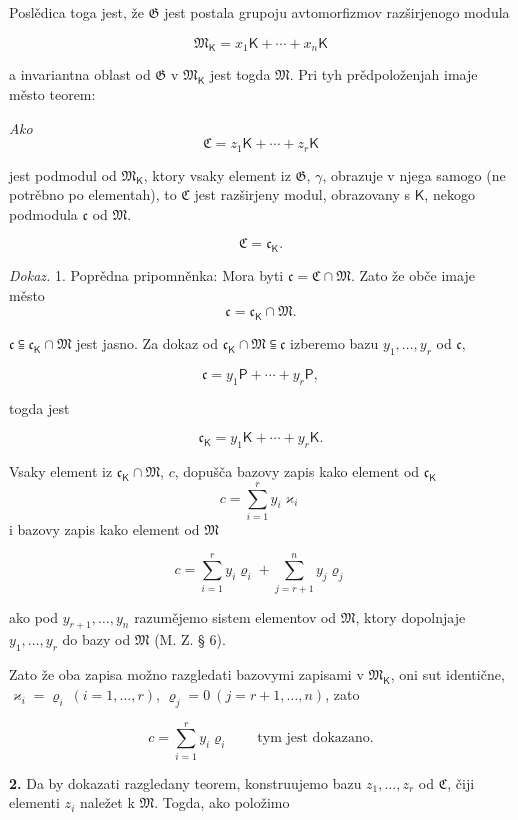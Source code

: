 \documentclass[11pt]{article}
\begin{document}
Poslědica toga jest, že \(\mathfrak G\) jest postala grupoju avtomorfizmov razširjenogo modula

\[
\mathfrak M_{\mathsf K}=x_1\mathsf K+\cdots+x_n\mathsf K
\]

a invariantna oblast od \(\mathfrak G\) v \(\mathfrak M_{\mathsf K}\) jest togda \(\mathfrak M\). Pri tyh prědpoloženjah imaje město teorem:

\begingroup\itshape
Ako
\[
\mathfrak C=z_1\mathsf K+\cdots+z_r\mathsf K
\]

jest podmodul od \(\mathfrak M_{\mathsf K}\), ktory vsaky element iz \(\mathfrak G\), \(\gamma\), obrazuje v njega samogo (ne potrěbno po elementah), to \(\mathfrak C\) jest razširjeny modul, obrazovany s \(\mathsf K\), nekogo podmodula \(\mathfrak c\) od \(\mathfrak M\).

\[
\mathfrak C=\mathfrak c_{\mathsf K}.
\]
\endgroup

\emph{Dokaz.} 1. Poprědna pripomněnka: Mora byti \(\mathfrak c=\mathfrak C\cap\mathfrak M\). Zato že obče imaje město
\[
\mathfrak c=\mathfrak c_{\mathsf K}\cap\mathfrak M.
\]

\(\mathfrak c\subseteqq\mathfrak c_{\mathsf K}\cap\mathfrak M\) jest jasno. Za dokaz od \(\mathfrak c_{\mathsf K}\cap\mathfrak M\subseteqq\mathfrak c\) izberemo bazu \(y_1,\ldots,y_r\) od \(\mathfrak c\),

\[
\mathfrak c=y_1\mathsf P+\cdots+y_r\mathsf P,
\]

togda jest

\[
\mathfrak c_{\mathsf K}=y_1\mathsf K+\cdots+y_r\mathsf K.
\]

Vsaky element iz \(\mathfrak c_{\mathsf K}\cap\mathfrak M\), \(c\), dopušča bazovy zapis kako element od \(\mathfrak c_{\mathsf K}\)
\[
c=\sum_{i=1}^{r}y_i\varkappa_i
\]
i bazovy zapis kako element od \(\mathfrak M\)

\[
c=\sum_{i=1}^{r}y_i\varrho_i+\sum_{j=r+1}^{n}y_j\varrho_j
\]

ako pod \(y_{r+1},\ldots,y_n\) razumějemo sistem elementov od \(\mathfrak M\), ktory dopolnjaje \(y_1,\ldots,y_r\) do bazy od \(\mathfrak M\) (M. Z. § 6).

Zato že oba zapisa možno razgledati bazovymi zapisami v \(\mathfrak M_{\mathsf K}\), oni sut identične, \(\varkappa_i=\varrho_i\ (i=1,\ldots,r)\), \(\varrho_j=0\ (j=r+1,\ldots,n)\), zato

\[
c=\sum_{i=1}^{r}y_i\varrho_i
\qquad\text{tym jest dokazano.}
\]

\textbf{2.} Da by dokazati razgledany teorem, konstruujemo bazu \(z_1,\ldots,z_r\) od \(\mathfrak C\), čiji elementi \(z_i\) naležet k \(\mathfrak M\). Togda, ako položimo
\end{document}
